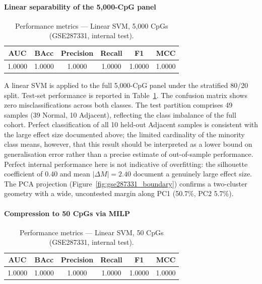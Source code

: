 \paragraph{Linear separability of the 5,000-CpG panel}

\begin{table}[t]
\centering
\scriptsize
\caption{Performance metrics --- Linear SVM, 5{,}000 CpGs (GSE287331, internal test).}
\label{tab:gse287331_5k}
\begin{tabular}{c c c c c c}
\toprule
AUC & BAcc & Precision & Recall & F1 & MCC \\
\midrule
1.0000 & 1.0000 & 1.0000 & 1.0000 & 1.0000 & 1.0000 \\
\bottomrule
\end{tabular}
\end{table}

A linear SVM is applied to the full 5,000-CpG panel under the stratified
80/20 split.
Test-set performance is reported in Table~\ref{tab:gse287331_5k}. The confusion matrix shows zero misclassifications across both classes.
The test partition comprises 49 samples (39 Normal, 10 Adjacent), 
reflecting the class imbalance of the full cohort. Perfect 
classification of all 10 held-out Adjacent samples is consistent 
with the large effect size documented above; the limited cardinality 
of the minority class means, however, that this result should be 
interpreted as a lower bound on generalisation error rather than a 
precise estimate of out-of-sample performance.
Perfect internal performance here is not indicative of overfitting: the
silhouette coefficient of 0.40 and mean $|\Delta M| = 2.40$ document a
genuinely large effect size. The PCA projection
(Figure~\ref{fig:gse287331_boundary}) confirms a two-cluster geometry
with a wide, uncontested margin along PC1 (50.7\%, PC2 5.7\%).


\paragraph{Compression to 50 CpGs via MILP}

\begin{table}[t]
\centering
\scriptsize
\caption{Performance metrics --- Linear SVM, 50 CpGs (GSE287331, internal test).}
\label{tab:gse287331_50}
\begin{tabular}{c c c c c c}
\toprule
AUC & BAcc & Precision & Recall & F1 & MCC \\
\midrule
1.0000 & 1.0000 & 1.0000 & 1.0000 & 1.0000 & 1.0000 \\
\bottomrule
\end{tabular}
\end{table}

